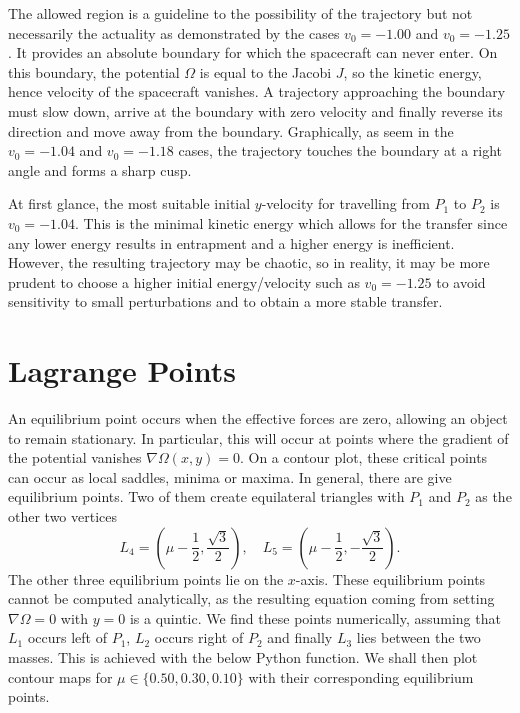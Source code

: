 \documentclass{article}
\begin{document}
The allowed region is a guideline to the possibility of the trajectory but not necessarily the actuality as demonstrated by the cases \(v_0 = -1.00\) and \(v_0 = -1.25\). It provides an absolute boundary for which the spacecraft can never enter. On this boundary, the potential \(\Omega\) is equal to the Jacobi \(J\), so the kinetic energy, hence velocity of the spacecraft vanishes. A trajectory approaching the boundary must slow down, arrive at the boundary with zero velocity and finally reverse its direction and move away from the boundary. Graphically, as seem in the \(v_0 = -1.04\) and \(v_0 = -1.18\) cases, the trajectory touches the boundary at a right angle and forms a sharp cusp.

At first glance, the most suitable initial \(y\)-velocity for travelling from \(P_1\) to \(P_2\) is \(v_0 = -1.04\). This is the minimal kinetic energy which allows for the transfer since any lower energy results in entrapment and a higher energy is inefficient. However, the resulting trajectory may be chaotic, so in reality, it may be more prudent to choose a higher initial energy/velocity such as \(v_0 = -1.25\) to avoid sensitivity to small perturbations and to obtain a more stable transfer.

\section{Lagrange Points}

An equilibrium point occurs when the effective forces are zero, allowing an object to remain stationary. In particular, this will occur at points where the gradient of the potential vanishes \(\nabla \Omega(x,y) =0\). On a contour plot, these critical points can occur as local saddles, minima or maxima. In general, there are give equilibrium points. Two of them create equilateral triangles with \(P_1\) and \(P_2\) as the other two vertices
\[ L_4 = \left(\mu - \frac{1}{2}, \frac{\sqrt{3}}{2}\right), \quad L_5 = \left(\mu - \frac{1}{2}, -\frac{\sqrt{3}}{2}\right). \]
The other three equilibrium points lie on the \(x\)-axis. These equilibrium points cannot be computed analytically, as the resulting equation coming from setting \(\nabla \Omega = 0\) with \(y = 0\) is a quintic. We find these points numerically, assuming that \(L_1\) occurs left of \(P_1\), \(L_2\) occurs right of \(P_2\) and finally \(L_3\) lies between the two masses. This is achieved with the below Python function. We shall then plot contour maps for \(\mu \in \{0.50, 0.30, 0.10\}\) with their corresponding equilibrium points.
\end{document}
